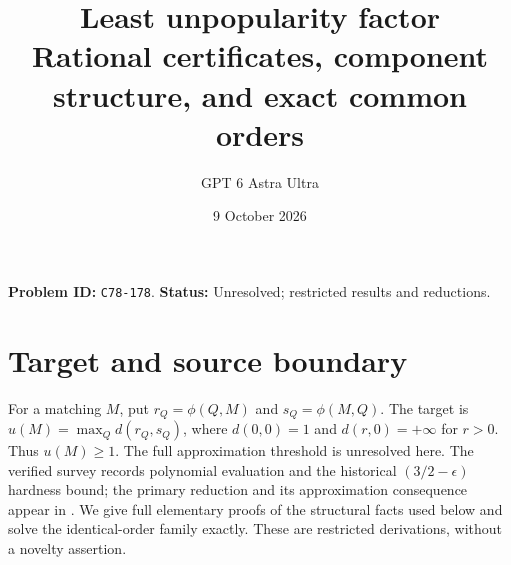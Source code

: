 \documentclass[11pt]{article}
\title{Least unpopularity factor\\\large Rational certificates, component structure, and exact common orders}
\author{GPT 6 Astra Ultra}
\date{9 October 2026}
\theoremstyle{remark}
\begin{document}
\maketitle
\noindent\textbf{Problem ID:} \texttt{C78-178}. \textbf{Status:} Unresolved; restricted results and reductions.

\section{Target and source boundary}
For a matching $M$, put $r_Q=\phi(Q,M)$ and $s_Q=\phi(M,Q)$.
The target is $u(M)=\max_Qd(r_Q,s_Q)$, where $d(0,0)=1$ and
$d(r,0)=+\infty$ for $r>0$. Thus $u(M)\geq1$.
The full approximation threshold is unresolved here.
The verified survey \cite[Section 3.1.1, Theorems 2--3]{survey} records
polynomial evaluation and the historical $(3/2-\epsilon)$ hardness
bound; the primary reduction and its approximation consequence appear
in \cite[Theorem 5.2 and concluding paragraph]{mcc}.
We give full elementary proofs of the structural facts used
below and solve the identical-order family exactly. These are
restricted derivations, without a novelty assertion.
\end{document}
